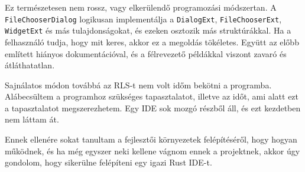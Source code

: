Ez természetesen nem rossz, vagy elkerülendő programozási módszertan.
A \texttt{File\-ChooserDialog} logikusan implementálja a \texttt{DialogExt}, \texttt{FileChooserExt},
\texttt{WidgetExt} és más tulajdonságokat, és ezeken osztozik más struktúrákkal.
Ha a felhasználó tudja, hogy mit keres, akkor ez a megoldás tökéletes.
Együtt az előbb említett hiányos dokumentációval, és a félrevezető példákkal viszont zavaró és átláthatatlan.

Sajnálatos módon továbbá az RLS-t nem volt időm bekötni a programba.
Alábecsültem a programhoz szükséges tapasztalatot, illetve az időt, ami alatt ezt a tapasztalatot megszerezhetem.
Egy IDE sok mozgó részből áll, és ezt kezdetben nem láttam át.

Ennek ellenére sokat tanultam a fejlesztői környezetek felépítéséről, hogy hogyan működnek,
és ha még egyszer neki kellene vágnom ennek a projektnek, akkor úgy gondolom,
hogy sikerülne felépíteni egy igazi Rust IDE-t.


